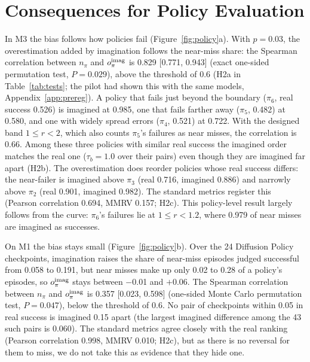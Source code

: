 \documentclass[10pt]{article}
\begin{document}
\section{Consequences for Policy Evaluation}
\label{sec:policy}

In M3 the bias follows how policies fail (Figure~\ref{fig:policy}a). With $p=0.03$, the overestimation added by imagination follows the near-miss share: the Spearman correlation between $n_\pi$ and $o^{\rm imag}_\pi$ is 0.829 [0.771, 0.943] (exact one-sided permutation test, $P=0.029$), above the threshold of 0.6 (H2a in Table~\ref{tab:tests}; the pilot had shown this with the same models, Appendix~\ref{app:prereg}). A policy that fails just beyond the boundary ($\pi_6$, real success 0.526) is imagined at 0.985, one that fails farther away ($\pi_5$, 0.482) at 0.580, and one with widely spread errors ($\pi_4$, 0.521) at 0.722. With the designed band $1\le r<2$, which also counts $\pi_5$'s failures as near misses, the correlation is 0.66. Among these three policies with similar real success the imagined order matches the real one ($\tau_b=1.0$ over their pairs) even though they are imagined far apart (H2b). The overestimation does reorder policies whose real success differs: the near-failer is imagined above $\pi_3$ (real 0.716, imagined 0.886) and narrowly above $\pi_2$ (real 0.901, imagined 0.982). The standard metrics register this (Pearson correlation 0.694, MMRV 0.157; H2c). This policy-level result largely follows from the curve: $\pi_6$'s failures lie at $1\le r<1.2$, where 0.979 of near misses are imagined as successes.

On M1 the bias stays small (Figure~\ref{fig:policy}b). Over the 24 Diffusion Policy checkpoints, imagination raises the share of near-miss episodes judged successful from 0.058 to 0.191, but near misses make up only 0.02 to 0.28 of a policy's episodes, so $o^{\rm imag}_\pi$ stays between $-$0.01 and $+$0.06. The Spearman correlation between $n_\pi$ and $o^{\rm imag}_\pi$ is 0.357 [0.023, 0.598] (one-sided Monte Carlo permutation test, $P=0.047$), below the threshold of 0.6. No pair of checkpoints within 0.05 in real success is imagined 0.15 apart (the largest imagined difference among the 43 such pairs is 0.060). The standard metrics agree closely with the real ranking (Pearson correlation 0.998, MMRV 0.010; H2c), but as there is no reversal for them to miss, we do not take this as evidence that they hide one.
\end{document}

